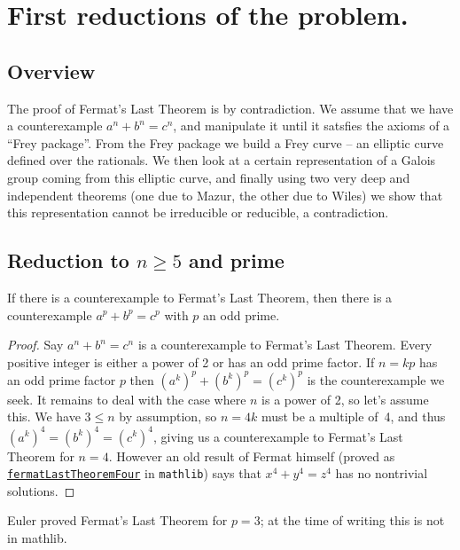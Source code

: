 \chapter{First reductions of the problem.}

\section{Overview}
The proof of Fermat's Last Theorem is by contradiction. We assume that we have a counterexample $a^n+b^n=c^n$, and manipulate it until it satsfies the axioms of a ``Frey package''. From the Frey package we build a Frey curve -- an elliptic curve defined over the rationals. We then look at a certain representation of a Galois group coming from this elliptic curve, and finally using two very deep and independent theorems (one due to Mazur, the other due to Wiles) we show that this representation cannot be irreducible or reducible, a contradiction.

\section{Reduction to \texorpdfstring{$n\geq5$}{ngeq5} and prime}

\begin{lemma}\label{WLOG_n_prime}\leanok
  If there is a counterexample to Fermat's Last Theorem, then there is a counterexample $a^p+b^p=c^p$
  with $p$ an odd prime.
\end{lemma}
\begin{proof}\leanok
  Say $a^n + b^n = c^n$ is a counterexample to Fermat's Last Theorem. Every positive integer is either
  a power of 2 or has an odd prime factor. If $n=kp$ has an odd prime factor $p$ then
  $(a^k)^p+(b^k)^p=(c^k)^p$ is the counterexample we seek. It remains to deal with the case where
  $n$ is a power of 2, so let's assume this. We have $3\leq n$ by assumption, so
  $n=4k$ must be a multiple of~4, and thus $(a^k)^4=(b^k)^4=(c^k)^4$, giving us a counterexample
  to Fermat's Last Theorem for $n=4$. However an old result of Fermat himself (proved as \href{https://leanprover-community.github.io/mathlib4_docs/Mathlib/NumberTheory/FLT/Four.html#fermatLastTheoremFour}{\tt fermatLastTheoremFour} in {\tt mathlib}) says that $x^4+y^4=z^4$ has no nontrivial solutions.
\end{proof}

Euler proved Fermat's Last Theorem for $p=3$; at the time of writing this is not in mathlib.

